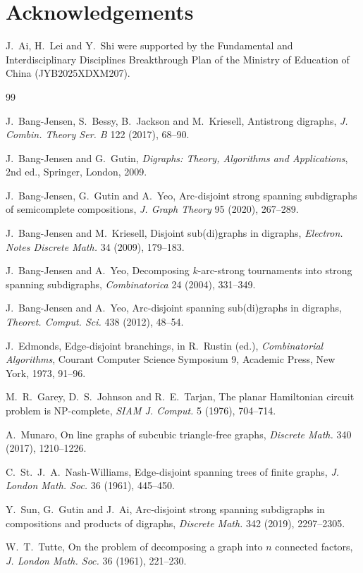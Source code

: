 \documentclass[12pt]{article}
\theoremstyle{remark}
\begin{document}
\section*{Acknowledgements}

J.~Ai, H.~Lei and Y.~Shi were supported by the Fundamental and Interdisciplinary Disciplines Breakthrough Plan of the Ministry of
Education of China (JYB2025XDXM207).

\begin{thebibliography}{99}
\setlength{\itemsep}{0pt}

J.~Bang-Jensen, S.~Bessy, B.~Jackson and M.~Kriesell,
Antistrong digraphs,
\emph{J. Combin. Theory Ser. B} 122 (2017), 68--90.

J.~Bang-Jensen and G.~Gutin,
\emph{Digraphs: Theory, Algorithms and Applications}, 2nd ed.,
Springer, London, 2009.

J.~Bang-Jensen, G.~Gutin and A.~Yeo,
Arc-disjoint strong spanning subdigraphs of semicomplete compositions,
\emph{J. Graph Theory} 95 (2020), 267--289.

J.~Bang-Jensen and M.~Kriesell,
Disjoint sub(di)graphs in digraphs,
\emph{Electron. Notes Discrete Math.} 34 (2009), 179--183.

J.~Bang-Jensen and A.~Yeo,
Decomposing $k$-arc-strong tournaments into strong spanning
subdigraphs,
\emph{Combinatorica} 24 (2004), 331--349.

J.~Bang-Jensen and A.~Yeo,
Arc-disjoint spanning sub(di)graphs in digraphs,
\emph{Theoret. Comput. Sci.} 438 (2012), 48--54.

J.~Edmonds,
Edge-disjoint branchings,
in R.~Rustin (ed.), \emph{Combinatorial Algorithms},
Courant Computer Science Symposium 9,
Academic Press, New York, 1973, 91--96.


M.~R.~Garey, D.~S.~Johnson and R.~E.~Tarjan,
The planar Hamiltonian circuit problem is NP-complete,
\emph{SIAM J. Comput.} 5 (1976), 704--714.

A.~Munaro,
On line graphs of subcubic triangle-free graphs,
\emph{Discrete Math.} 340 (2017), 1210--1226.

C.~St.~J.~A.~Nash-Williams,
Edge-disjoint spanning trees of finite graphs,
\emph{J. London Math. Soc.} 36 (1961), 445--450.

Y.~Sun, G.~Gutin and J.~Ai,
Arc-disjoint strong spanning subdigraphs in compositions and products
of digraphs,
\emph{Discrete Math.} 342 (2019), 2297--2305.

W.~T.~Tutte,
On the problem of decomposing a graph into $n$ connected factors,
\emph{J. London Math. Soc.} 36 (1961), 221--230.

\end{thebibliography}
\end{document}
